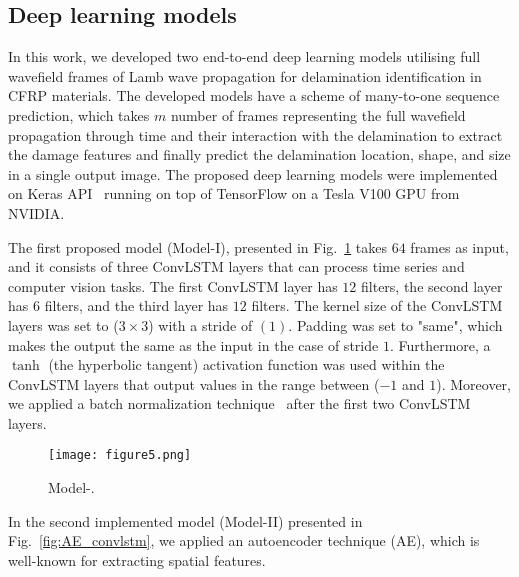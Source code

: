 \subsection{Deep learning models}
\label{proposed_approach}
\begin{sloppypar}
	In this work, we developed two end-to-end deep learning models utilising full wavefield frames of Lamb wave propagation for delamination identification in CFRP materials.
	The developed models have a scheme of many-to-one sequence prediction, which takes \(m\) number of frames representing the full wavefield propagation through time and their interaction with the delamination to extract the damage features and finally predict the delamination location, shape, and size in a single output image.
	The proposed deep learning models were implemented on Keras API~\cite{chollet2015keras} running on top of TensorFlow on a Tesla V100 GPU from NVIDIA.
	
	The first proposed model (Model-I), presented in Fig.~\ref{fig:convlstm_model} takes \(64\) frames as input, and it consists of three ConvLSTM layers that can process time series and computer vision tasks.
	The first ConvLSTM layer has \(12\) filters, the second layer has \(6\) filters, and the third layer has \(12\) filters.
	The kernel size of the ConvLSTM layers was set to (\(3\times3\)) with a stride of \((1)\). 
	Padding was set to "same", which makes the output the same as the input in the case of stride \(1\).
	Furthermore, a \(\tanh\) (the hyperbolic tangent) activation function was used within the ConvLSTM layers that output values in the range between (\(-1\) and \(1\)).
	Moreover, we applied a batch normalization technique~\cite{Santurkar2018} after the first two ConvLSTM layers.
	\begin{figure} [!ht]
		\centering
			\centering
			\texttt{[image: figure5.png]}
			\caption{Model-.} %
			\label{fig:convlstm_model}
	\end{figure}

	In the second implemented model (Model-II) presented in Fig.~\ref{fig:AE_convlstm}, we applied an autoencoder technique (AE), which is well-known for extracting spatial features.
	

\end{sloppypar}
